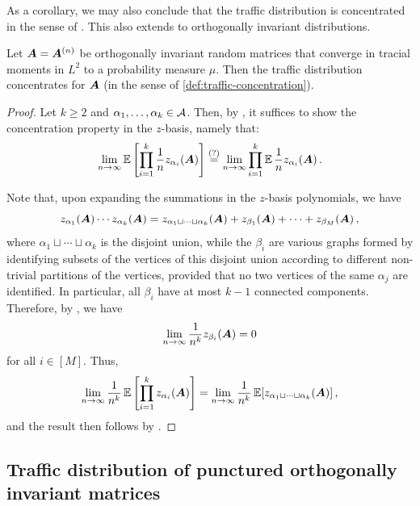 As a corollary, we may also conclude that the traffic distribution is concentrated in the sense of .
This also extends {\cite[Theorem 4.7]{cebron2024traffic}} to orthogonally invariant distributions.
\begin{lemma}
    \label{lemma:full-factorization}
    Let ${\bm A}={\bm A}^{(n)}$ be orthogonally invariant random matrices that converge in tracial moments in $L^2$ to a probability measure $\mu$.
    Then the traffic distribution concentrates for ${\bm A}$ (in the sense of \cref{def:traffic-concentration}).
\end{lemma}
\begin{proof}
    Let $k\ge 2$ and $\alpha_1,\ldots,\alpha_k\in {\cal A}$. Then, by , it suffices to show the concentration property in the $z$-basis, namely that:
    \begin{align*}
        \lim_{n\to\infty} \operatorname*{\mathbb{E}}\left[\prod_{i=1}^k \frac 1n z_{\alpha_i}({\bm A})\right] 
        \stackrel{\text{(?)}}{=} \lim_{n\to\infty} \prod_{i=1}^k \operatorname*{\mathbb{E}} \frac 1n z_{\alpha_i}({\bm A})\,.
    \end{align*}

    Note that, upon expanding the summations in the $z$-basis polynomials, we have
    \[ z_{\alpha_1}({\bm A}) \cdots z_{\alpha_k}({\bm A}) = z_{\alpha_1 \sqcup \cdots \sqcup \alpha_k}({\bm A}) + z_{\beta_1}({\bm A}) + \cdots + z_{\beta_M}({\bm A})\,, \]
    where $\alpha_1 \sqcup \cdots \sqcup \alpha_k$ is the disjoint union, while the $\beta_i$ are various graphs formed by identifying subsets of the vertices of this disjoint union according to different non-trivial partitions of the vertices, provided that no two vertices of the same $\alpha_j$ are identified.
    In particular, all $\beta_i$ have at most $k - 1$ connected components.
    Therefore, by , we have
    \[ \lim_{n \to \infty} \frac{1}{n^k} z_{\beta_i}({\bm A}) = 0 \]
    for all $i \in [M]$.
    Thus, 
    \[ \lim_{n \to \infty} \frac{1}{n^k}\operatorname*{\mathbb{E}}\left[\prod_{i=1}^k z_{\alpha_i}({\bm A})\right] = \lim_{n \to \infty} \frac{1}{n^k}\operatorname*{\mathbb{E}}[z_{\alpha_1 \sqcup \cdots \sqcup \alpha_k}({\bm A})]\,, \]
    and the result then follows by .
\end{proof}

\subsection{Traffic distribution of punctured orthogonally invariant matrices}
\label{sec:puncturedWeingarten}

